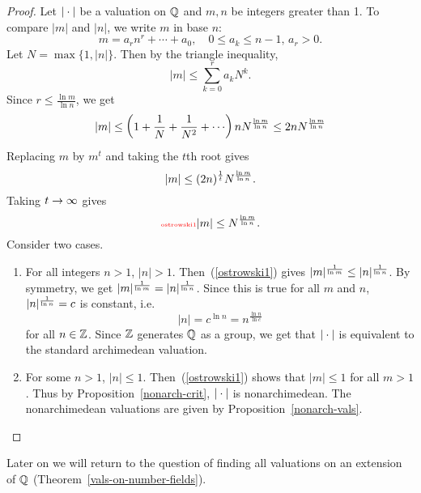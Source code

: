 \begin{proof}
Let $|\cdot|$ be a valuation on $\mathbb{Q}$ and $m,n$ be integers greater than 1. To compare $|m|$ and $|n|$, we write $m$ in base $n$:
\[
m=a_rn^r+\cdots +a_0, \quad 0\le a_k\le n-1, \,a_r>0.
\]
Let $N=\max\{1,|n|\}$. Then by the triangle inequality,
\[
|m|\le \sum_{k=0}^r a_kN^k.
\]
Since $r\le \frac{\ln m}{\ln n}$, we get
\[
|m|\le \left( {1+\frac{1}{N}+\frac{1}{N^2}+\cdots } \right)nN^{\frac{\ln m}{\ln n}}
\le 2nN^{\frac{\ln m}{\ln n}}
\]
Replacing $m$ by $m^t$ and taking the $t$th root gives
\[
|m|\le %
(2n)^{\rc t}N^{\frac{\ln m}{\ln n}}.
\]
Taking $t\to \infty$ %
gives
\begin{equation}\llabel{ostrowski1}
|m|\le N^{\frac{\ln m}{\ln n}}.
\end{equation}
Consider two cases.
\begin{enumerate}
\item For all integers $n>1$, $|n|>1$. Then~(\ref{ostrowski1}) gives $|m|^{\frac{1}{\ln m}}\le |n|^{\frac{1}{\ln n}}$. By symmetry, we get $|m|^{\frac{1}{\ln m}}= |n|^{\frac{1}{\ln n}}$. Since this is true for all $m$ and $n$, $|n|^{\frac{1}{\ln n}}=c$ is constant, i.e.
\[
|n|=c^{\ln n}=n^{\frac{\ln n}{\ln c}}
\]
for all $n\in \mathbb{Z}$. Since $\mathbb{Z}$ generates $\mathbb{Q}$ as a group, we get that $|\cdot|$ is equivalent to the standard archimedean valuation.
\item For some $n>1$, $|n|\le 1$. Then~(\ref{ostrowski1}) shows that $|m|\le 1$ for all $m>1$. Thus by Proposition~\ref{nonarch-crit}, $|\cdot|$ is nonarchimedean.
The nonarchimedean valuations are given by Proposition~\ref{nonarch-vals}.\qedhere
\end{enumerate}
\end{proof}
Later on we will return to the question of finding all valuations on an extension of $\mathbb{Q}$ (Theorem~\ref{vals-on-number-fields}).

